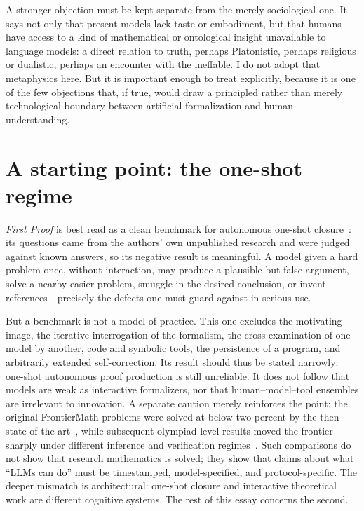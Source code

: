 \documentclass[
  aps,
  reprint,
  superscriptaddress,
  floatfix,
  nofootinbib,
  longbibliography
]{revtex4-2}
\begin{document}
A stronger objection must be kept separate from the merely sociological one. It
says not only that present models lack taste or embodiment, but that humans have
access to a kind of mathematical or ontological insight unavailable to language
models: a direct relation to truth, perhaps Platonistic, perhaps religious or
dualistic, perhaps an encounter with the ineffable. I do not adopt that
metaphysics here. But it is important enough to treat explicitly, because it is
one of the few objections that, if true, would draw a principled rather than
merely technological boundary between artificial formalization and human
understanding.

\section{A starting point: the one-shot regime}
\label{sec:firstproof}

\textit{First Proof} is best read as a clean benchmark for autonomous one-shot
closure~\cite{firstproof}: its questions came from the authors' own unpublished
research and were judged against known answers, so its negative result is
meaningful. A model given a hard problem once, without interaction, may produce a
plausible but false argument, solve a nearby easier problem, smuggle in the
desired conclusion, or invent references---precisely the defects one must guard
against in serious use.

But a benchmark is not a model of practice. This one excludes the motivating
image, the iterative interrogation of the formalism, the cross-examination of one
model by another, code and symbolic tools, the persistence of a program, and
arbitrarily extended self-correction. Its result should thus be stated narrowly:
one-shot autonomous proof production is still unreliable. It does not follow that
models are weak as interactive formalizers, nor that human--model--tool ensembles
are irrelevant to innovation. A separate caution merely reinforces the point: the
original FrontierMath problems were solved at below two percent by the then
state of the art~\cite{frontiermath}, while subsequent olympiad-level results
moved the frontier sharply under different inference and verification
regimes~\cite{deepmindimo,openaiimo,reutersimo}. Such comparisons do not show
that research mathematics is solved; they show that claims about what ``LLMs can
do'' must be timestamped, model-specified, and protocol-specific. The deeper
mismatch is architectural: one-shot closure and interactive theoretical work are
different cognitive systems. The rest of this essay concerns the second.
\end{document}
